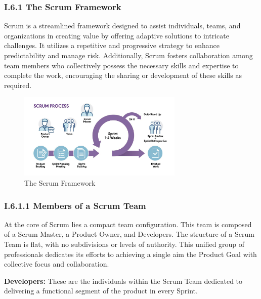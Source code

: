 \subsubsection*{I.6.1 The Scrum Framework}
Scrum is a streamlined framework designed to assist individuals, teams, and organizations in creating value by offering adaptive solutions to intricate challenges. It utilizes a repetitive and progressive strategy to enhance predictability and manage risk. Additionally, Scrum fosters collaboration among team members who collectively possess the necessary skills and expertise to complete the work, encouraging the sharing or development of these skills as required.


\begin{figure}[H]
    \centering
    \includegraphics[width=0.7\textwidth]{src/assets/chapters/blog-scrum-process-opt.jpg}
    \caption{The Scrum Framework}
    \label{fig:Scrum_Framework_image}
\end{figure}




\subsubsection*{I.6.1.1 Members of a Scrum Team}

At the core of Scrum lies a compact team configuration. This team is composed of a Scrum Master, a Product Owner, and Developers. The structure of a Scrum Team is flat, with no subdivisions or levels of authority. This unified group of professionals dedicates its efforts to achieving a single aim the Product Goal with collective focus and collaboration.

\textbf{Developers:} These are the individuals within the Scrum Team dedicated to delivering a functional segment of the product in every Sprint.


